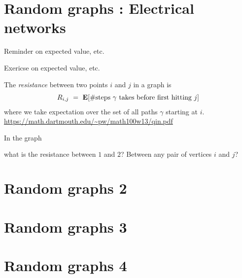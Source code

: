 \documentclass[11pt,fleqn]{book} %
\begin{document}
\newpage 
 \chapter{Random graphs : Electrical networks}


\begin{definition}
Reminder on expected value, etc. 
\end{definition}

\begin{problem}
  Exericse on expected value, etc. 
\end{problem}


\begin{definition}
The \emph{resistance} between two points $i$ and $j$ in a graph is 
$$R_{i,j} \ = \ \mathbf{E}[\#\textup{steps }\gamma \textup{ takes before first hitting }j]$$
where we take expectation over the set of all paths $\gamma$ starting at $i$. 
\url{https://math.dartmouth.edu/~pw/math100w13/qin.pdf}
\end{definition}

\begin{problem}
   In the graph 
   \begin{center}
    \end{center}
    what is the resistance between $1$ and $2$? Between any pair of vertices $i$ and $j$?
\end{problem}









\newpage 
 \chapter{Random graphs 2}
\kapiteldatum{}


\newpage 
    \chapter{Random graphs 3}
\kapiteldatum{}


\newpage 
    \chapter{Random graphs 4}
\kapiteldatum{}
\end{document}
